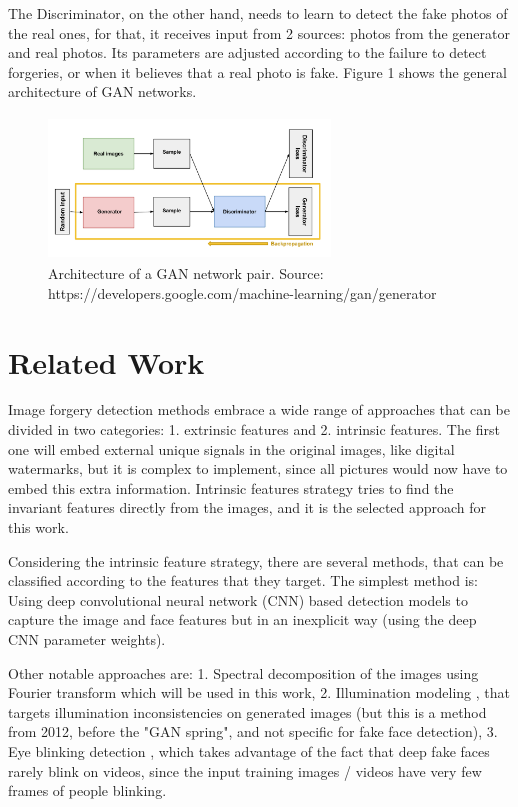\documentclass{bmvc2k}
\begin{document}
The Discriminator, on the other hand, needs to learn to detect the fake photos of the real ones, for that, it receives input from 2 sources: photos from the generator and real photos. Its parameters are adjusted according to the failure to detect forgeries, or when it believes that a real photo is fake. Figure 1 shows the general architecture of GAN networks.

\begin{figure}[!h]
\centering
\includegraphics[width=7.5cm, height=3.8cm]{GAN.png}
    \caption{Architecture of a GAN network pair. Source: https://developers.google.com/machine-learning/gan/generator}
\end{figure}

\section{Related Work}

Image forgery detection methods embrace a wide range of approaches that can be divided in two categories:
1. extrinsic features and 2. intrinsic features. The first one will embed external unique signals in the original images, like digital watermarks, but it is complex to implement, since all pictures would now have to embed this extra information. Intrinsic features strategy tries to find the invariant features directly from the images, and it is the selected approach for this work.

Considering the intrinsic feature strategy, there are several methods, that can be classified according to the features that they target. The simplest method is: Using deep convolutional neural network (CNN) based detection models to capture the image and face features but in an inexplicit way (using the deep CNN parameter weights). 

Other notable approaches are: 1. Spectral decomposition of the images using Fourier transform \cite{durall2019unmasking} which will be used in this work, 2. Illumination modeling \cite{journals/tifs/CarvalhoRAPR13}, that targets illumination inconsistencies on generated images (but this is a method from 2012, before the "GAN spring", and not specific for fake face detection), 3. Eye blinking detection \cite{journals/corr/abs-1806-02877}, which takes advantage of the fact that deep fake faces rarely blink on videos, since the input training images / videos have very few frames of people blinking.
\end{document}
